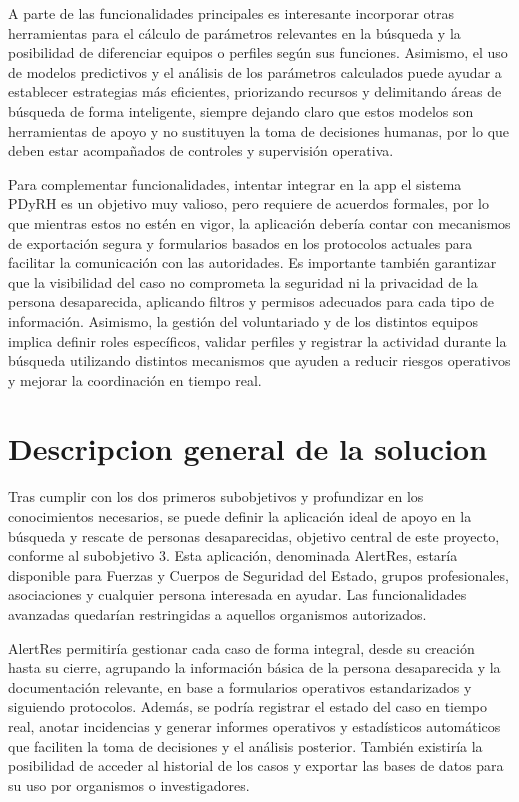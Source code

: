     A parte de las funcionalidades principales es interesante incorporar otras herramientas para el cálculo de parámetros relevantes en la búsqueda y la posibilidad de diferenciar equipos o perfiles según sus funciones. Asimismo, el uso de modelos predictivos y el análisis de los parámetros calculados puede ayudar a establecer estrategias más eficientes, priorizando recursos y delimitando áreas de búsqueda de forma inteligente, siempre dejando claro que estos modelos son herramientas de apoyo y no sustituyen la toma de decisiones humanas, por lo que deben estar acompañados de controles y supervisión operativa. 
    
    Para complementar funcionalidades, intentar integrar en la app el sistema PDyRH es un objetivo muy valioso, pero requiere de acuerdos formales, por lo que mientras estos no estén en vigor, la aplicación debería contar con mecanismos de exportación segura y formularios basados en los protocolos actuales para facilitar la comunicación con las autoridades. Es importante también garantizar que la visibilidad del caso no comprometa la seguridad ni la privacidad de la persona desaparecida, aplicando filtros y permisos adecuados para cada tipo de información. Asimismo, la gestión del voluntariado y de los distintos equipos implica definir roles específicos, validar perfiles y registrar la actividad durante la búsqueda utilizando distintos mecanismos que ayuden a reducir riesgos operativos y mejorar la coordinación en tiempo real.
    
    

    \section{Descripcion general de la solucion}\label{descripcion1} %
    
    Tras cumplir con los dos primeros subobjetivos y profundizar en los conocimientos necesarios, se puede definir la aplicación ideal de apoyo en la búsqueda y rescate de personas desaparecidas, objetivo central de este proyecto, conforme al subobjetivo 3. Esta aplicación, denominada AlertRes, estaría disponible para Fuerzas y Cuerpos de Seguridad del Estado, grupos profesionales, asociaciones y cualquier persona interesada en ayudar. Las funcionalidades avanzadas quedarían restringidas a aquellos organismos autorizados.

    AlertRes permitiría gestionar cada caso de forma integral, desde su creación hasta su cierre, agrupando la información básica de la persona desaparecida y la documentación relevante, en base a formularios operativos estandarizados y siguiendo protocolos. Además, se podría registrar el estado del caso en tiempo real, anotar incidencias y generar informes operativos y estadísticos automáticos que faciliten la toma de decisiones y el análisis posterior. También existiría la posibilidad de acceder al historial de los casos y exportar las bases de datos para su uso por organismos o investigadores.    
    \vspace{0.5cm}

